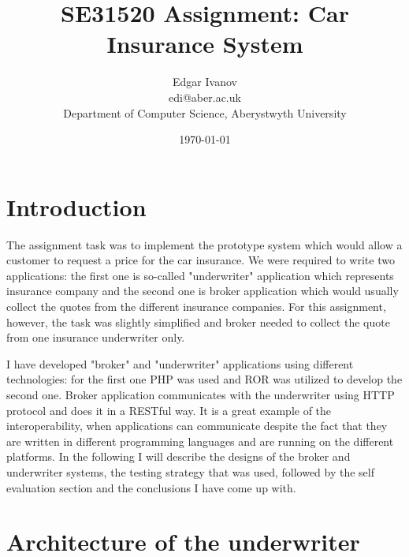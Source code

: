 \documentclass[10pt,a4paper,headinclude=true,twoside]{report}
\begin{document}
\title{SE31520 Assignment: Car Insurance System}
\author{Edgar Ivanov\\ edi@aber.ac.uk \\ Department of Computer Science, Aberystwyth University}
\date{\today}
\maketitle

\newpage
\thispagestyle{empty}
\mbox{}

\tableofcontents

\section{Introduction}
The assignment task was to implement the prototype system which would allow a customer to request a price for the car insurance. We were required to write two applications: the first one is so-called "underwriter" application which represents insurance company and the second one is broker application which would usually collect the quotes from the different insurance companies. For this assignment, however, the task was slightly simplified and broker needed to collect the quote from one insurance underwriter only.

I have developed "broker" and "underwriter" applications using different technologies: for the first one PHP was used and ROR was utilized to develop the second one. Broker application communicates with the underwriter using HTTP protocol and does it in a RESTful way. It is a great example of the interoperability, when applications can communicate despite the fact that they are written in different programming languages and are running on the different platforms. In the following I will describe the designs of the broker and underwriter systems, the testing strategy that was used, followed by the self evaluation section and the conclusions I have come up with. 

\section{Architecture of the underwriter}
\end{document}
